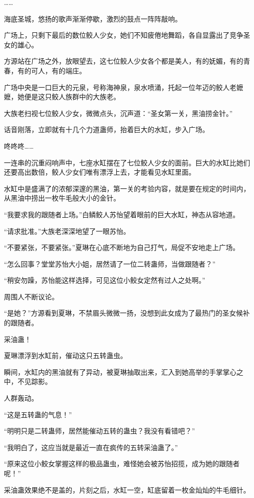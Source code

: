 \begin{this_body}
……

海底圣城，悠扬的歌声渐渐停歇，激烈的鼓点一阵阵敲响。

广场上，只剩下最后的数位鲛人少女，她们不知疲倦地舞蹈，各自显露出了竞争圣女的雄心。

方源站在广场之外，放眼望去，这七位鲛人少女各个都是美人，有的妩媚，有的青春，有的可人，有的端庄。

广场中央是一口巨大的元泉，号称海神泉，泉水喷涌，托起一位年迈的鲛人老嬷嬷，她便是这只鲛人族群中的大族老。

大族老扫视七位鲛人少女，微微点头，沉声道：“圣女第一关，黑油捞金针。”

话音刚落，立即就有十几个力道蛊师，抬着巨大的水缸，步入广场。

咚咚咚……

一连串的沉重闷响声中，七座水缸摆在了七位鲛人少女的面前。巨大的水缸比她们还要高出数倍，鲛人少女们唯有漂浮上去，才能看见水缸里面。

水缸中是盛满了的浓郁深邃的黑油，第一关的考验内容，就是要在规定的时间内，从黑油中捞出一枚牛毛般大小的金针。

“我要求我的跟随者上场。”白鳞鲛人苏怡望着眼前的巨大水缸，神态从容地道。

“请求批准。”大族老深深地望了一眼苏怡。

“不要紧张，不要紧张。”夏琳在心底不断地为自己打气，局促不安地走上广场。

“怎么回事？堂堂苏怡大小姐，居然请了一位二转蛊师，当做跟随者？”

“稍安勿躁，苏怡能这样选择，可见这位小鲛女定然有过人之处啊。”

周围人不断议论。

“是她？”方源看到夏琳，不禁眉头微微一扬，没想到此女成为了最热门的圣女候补的跟随者。

采油蛊！

夏琳漂浮到水缸前，催动这只五转蛊虫。

瞬间，水缸内的黑油就有了异动，被夏琳抽取出来，汇入到她高举的手掌掌心之中，不见踪影。

人群轰动。

“这是五转蛊的气息！”

“明明只是二转蛊师，居然能催动五转的蛊虫？我没有看错吧？”

“我明白了，这应当就是最近一直在疯传的五转采油蛊了。”

“原来这位小鲛女掌握这样的极品蛊虫，难怪她会被苏怡招揽，成为她的跟随者呢！”

采油蛊效果绝不是盖的，片刻之后，水缸一空，缸底留着一枚金灿灿的牛毛细针。


\end{this_body}
